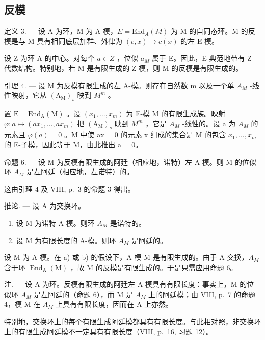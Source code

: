 \subsection{反模}

定义 3. --- 设 A 为环，M 为 A-模，\(E = \text{End}_{A}(M)\) 为 M 的自同态环。M 的反模是与 M 具有相同底层加群、外律为 \((c, x) \mapsto c(x)\) 的左 E-模。

设 Z 为环 A 的中心。对每个 \(a \in Z\) ，位似 \(a_{M}\) 属于 E。因此，E 典范地带有 Z-代数结构。特别地，若 M 是有限生成的 Z-模，则 M 的反模是有限生成的。

引理 4. --- 设 M 为反模有限生成的左 A-模。则存在自然数 m 以及一个单 \(A_{M}\) -线性映射，它从 \((\mathrm{A}_{\mathrm{M}})_{s}\) 映到 \(M^{m}\) 。

置 \(\mathrm{E}=\mathrm{End}_{\mathrm{A}}(\mathrm{M})\) 。设 \((x_{1},\ldots,x_{m})\) 为 E-模 M 的有限生成族。映射 \(\varphi:a\mapsto(ax_{1},\ldots,ax_{m})\) 把 \((\mathrm{A}_{\mathrm{M}})_{s}\) 映到 \(M^{m}\) ，它是 \(A_{M}\) -线性的。设 a 为 \(A_{M}\) 的元素且 \(\varphi(a)=0\) 。M 中使 ax = 0 的元素 x 组成的集合是 M 的包含 \(x_{1}, \ldots, x_{m}\) 的 E-子模，因此等于 M，由此推出 a = 0。

命题 6. --- 设 M 为反模有限生成的阿廷（相应地，诺特）左 A-模。则 M 的位似环 \(A_{M}\) 是左阿廷（相应地，左诺特）的。

这由引理 4 及 VIII, p.~3 的命题 3 得出。

推论. --- 设 A 为交换环。

\begin{enumerate}
\def\labelenumi{\alph{enumi})}
\item
  设 M 为诺特 A-模。则环 \(A_{M}\) 是诺特的。
\item
  设 M 为有限长度的 A-模。则环 \(A_{M}\) 是阿廷的。
\end{enumerate}

设 M 为 A-模。在 a) 或 b) 的假设下，A-模 M 是有限生成的。由于 A 交换，\(A_{M}\) 含于环 \(\operatorname{End}_{\mathrm{A}}(\mathrm{M})\) ，故 M 的反模是有限生成的。于是只需应用命题 6。

注. --- 设 A 为环。反模有限生成的阿廷左 A-模具有有限长度：事实上，M 的位似环 \(A_{M}\) 是左阿廷的（命题 6），而 M 是 \(A_{M}\) 上的阿廷模；由 VIII, p.~7 的命题 4，模 M 在 \(A_{M}\) 上具有有限长度，因而在 A 上亦然。

特别地，交换环上的每个有限生成阿廷模都具有有限长度。与此相对照，非交换环上的有限生成阿廷模不一定具有有限长度（VIII, p.~16, 习题 12）。

